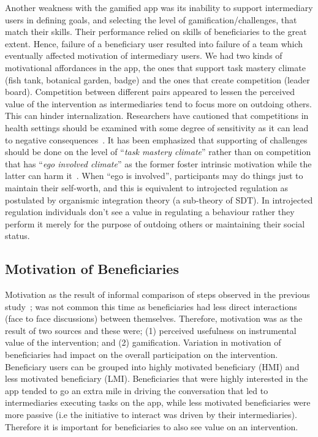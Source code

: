 \documentclass{sig-alternate}
\begin{document}
Another weakness with the gamified app was its inability to support intermediary users in defining goals, and selecting the level of gamification/challenges, that match their skills. Their performance relied on skills of beneficiaries to the great extent. Hence, failure of a beneficiary user resulted into failure of a team  which eventually affected motivation of intermediary users. We had two kinds of motivational affordances in the app, the ones that support task mastery climate (fish tank, botanical garden, badge) and the ones that create competition (leader board). Competition between different pairs appeared to lessen the perceived value of the intervention as intermediaries tend to focus more on outdoing others. This can hinder internalization.  Researchers have cautioned that competitions in health settings should be examined with some degree of sensitivity as it can lead to negative consequences~\cite{grimes2009toward}. It has been emphasized that supporting of  challenges should be done on the level of ``\emph{task mastery climate}'' rather than on competition that has ``\emph{ego involved climate}'' as the  former foster intrinsic motivation while the latter can harm it~\cite{saksono2015spaceship}. When ``ego is involved'', participants may do things just to maintain their self-worth, and this is equivalent to introjected regulation as postulated by organismic integration theory (a sub-theory of SDT)\cite{ryan2000:self}. In introjected regulation individuals don't see a value in regulating a behaviour rather they perform it merely for the purpose of outdoing others or maintaining their social status.

\subsection*{\textbf{Motivation of Beneficiaries}}
Motivation as the result of informal comparison of steps observed in the previous study~\cite{katule2016:leveraging}; was not common this time as beneficiaries had less direct interactions (face to face discussions) between themselves. Therefore, motivation was as the result of two sources and these were; (1) perceived usefulness on instrumental value of the intervention; and (2) gamification. Variation in  motivation of beneficiaries had impact on the overall participation on the intervention. Beneficiary users can be grouped into highly motivated beneficiary (HMI) and less motivated beneficiary (LMI). Beneficiaries that were highly interested in the app tended to go an extra mile in driving the conversation that led to intermediaries executing tasks on the app, while less motivated beneficiaries were more passive (i.e the initiative to interact was driven by their intermediaries). Therefore it is important for beneficiaries to also see value on an intervention. 
\end{document}
